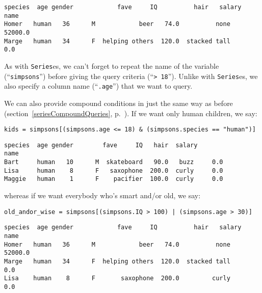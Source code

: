 \begin{Verbatim}[fontsize=\small,samepage=true,frame=leftline,framesep=5mm,framerule=1mm]
      species  age gender            fave     IQ          hair   salary
name                                                                   
Homer   human   36      M            beer   74.0          none  52000.0
Marge   human   34      F  helping others  120.0  stacked tall      0.0
\end{Verbatim}

As with \texttt{Series}es, we can't forget to repeat the name of the variable
(``\texttt{simpsons}'') before giving the query criteria (``\texttt{> 18}'').
Unlike with \texttt{Series}es, we also specify a column name
(``\texttt{.age}'') that we want to query.


We can also provide compound conditions in just the same way as before
(section~\ref{seriesCompoundQueries}, p.~\pageref{seriesCompoundQueries}). If
we want only human children, we say:

\begin{Verbatim}[fontsize=\small,samepage=true,frame=single,framesep=3mm]
kids = simpsons[(simpsons.age <= 18) & (simpsons.species == "human")]
\end{Verbatim}
\vspace{-.2in}

\begin{Verbatim}[fontsize=\small,samepage=true,frame=leftline,framesep=5mm,framerule=1mm]
       species  age gender        fave     IQ   hair  salary
name                                                        
Bart     human   10      M  skateboard   90.0   buzz     0.0
Lisa     human    8      F   saxophone  200.0  curly     0.0
Maggie   human    1      F    pacifier  100.0  curly     0.0
\end{Verbatim}

whereas if we want everybody who's smart and/or old, we say:

\begin{Verbatim}[fontsize=\small,samepage=true,frame=single,framesep=3mm]
old_andor_wise = simpsons[(simpsons.IQ > 100) | (simpsons.age > 30)]
\end{Verbatim}
\vspace{-.2in}

\begin{Verbatim}[fontsize=\small,samepage=true,frame=leftline,framesep=5mm,framerule=1mm]
      species  age gender            fave     IQ          hair   salary
name                                                                   
Homer   human   36      M            beer   74.0          none  52000.0
Marge   human   34      F  helping others  120.0  stacked tall      0.0
Lisa    human    8      F       saxophone  200.0         curly      0.0
\end{Verbatim}

